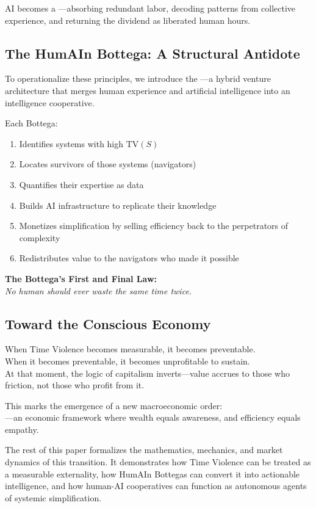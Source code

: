 AI becomes a —absorbing redundant labor, decoding patterns from collective experience, and returning the dividend as liberated human hours.

\subsection{The HumAIn Bottega: A Structural Antidote}
\label{sec:bottega}

To operationalize these principles, we introduce the —a hybrid venture architecture that merges human experience and artificial intelligence into an intelligence cooperative.

Each Bottega:
\begin{enumerate}
    \item Identifies systems with high $\text{TV}(S)$
    \item Locates survivors of those systems (navigators)
    \item Quantifies their expertise as data
    \item Builds AI infrastructure to replicate their knowledge
    \item Monetizes simplification by selling efficiency back to the perpetrators of complexity
    \item Redistributes value to the navigators who made it possible
\end{enumerate}

\begin{fundamentallaw}
\textbf{The Bottega's First and Final Law:}\\
\textit{No human should ever waste the same time twice.}
\end{fundamentallaw}

\subsection{Toward the Conscious Economy}
\label{sec:toward-conscious-economy}

When Time Violence becomes measurable, it becomes preventable.\\
When it becomes preventable, it becomes unprofitable to sustain.\\
At that moment, the logic of capitalism inverts—value accrues to those who  friction, not those who profit from it.

This marks the emergence of a new macroeconomic order:\\
—an economic framework where wealth equals awareness, and efficiency equals empathy.

The rest of this paper formalizes the mathematics, mechanics, and market dynamics of this transition. It demonstrates how Time Violence can be treated as a measurable externality, how HumAIn Bottegas can convert it into actionable intelligence, and how human-AI cooperatives can function as autonomous agents of systemic simplification.
